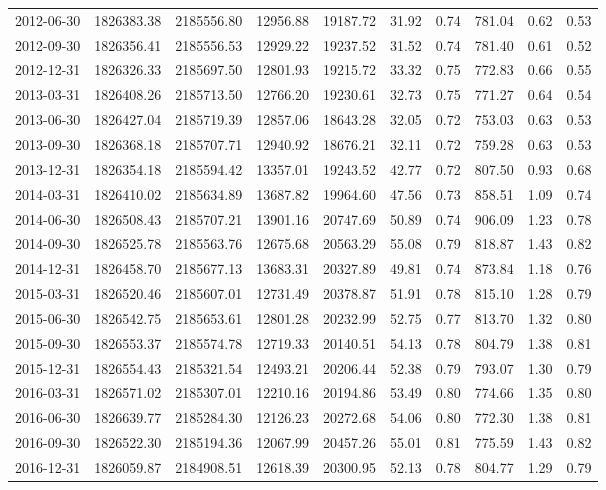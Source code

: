 \begin{landscape}
\begin{longtable}{llllllllll}
2012-06-30 & 1826383.38 & 2185556.80 & 12956.88 & 19187.72 & 31.92 & 0.74 & 781.04 & 0.62 & 0.53 \\
2012-09-30 & 1826356.41 & 2185556.53 & 12929.22 & 19237.52 & 31.52 & 0.74 & 781.40 & 0.61 & 0.52 \\
2012-12-31 & 1826326.33 & 2185697.50 & 12801.93 & 19215.72 & 33.32 & 0.75 & 772.83 & 0.66 & 0.55 \\
2013-03-31 & 1826408.26 & 2185713.50 & 12766.20 & 19230.61 & 32.73 & 0.75 & 771.27 & 0.64 & 0.54 \\
2013-06-30 & 1826427.04 & 2185719.39 & 12857.06 & 18643.28 & 32.05 & 0.72 & 753.03 & 0.63 & 0.53 \\
2013-09-30 & 1826368.18 & 2185707.71 & 12940.92 & 18676.21 & 32.11 & 0.72 & 759.28 & 0.63 & 0.53 \\
2013-12-31 & 1826354.18 & 2185594.42 & 13357.01 & 19243.52 & 42.77 & 0.72 & 807.50 & 0.93 & 0.68 \\
2014-03-31 & 1826410.02 & 2185634.89 & 13687.82 & 19964.60 & 47.56 & 0.73 & 858.51 & 1.09 & 0.74 \\
2014-06-30 & 1826508.43 & 2185707.21 & 13901.16 & 20747.69 & 50.89 & 0.74 & 906.09 & 1.23 & 0.78 \\
2014-09-30 & 1826525.78 & 2185563.76 & 12675.68 & 20563.29 & 55.08 & 0.79 & 818.87 & 1.43 & 0.82 \\
2014-12-31 & 1826458.70 & 2185677.13 & 13683.31 & 20327.89 & 49.81 & 0.74 & 873.84 & 1.18 & 0.76 \\
2015-03-31 & 1826520.46 & 2185607.01 & 12731.49 & 20378.87 & 51.91 & 0.78 & 815.10 & 1.28 & 0.79 \\
2015-06-30 & 1826542.75 & 2185653.61 & 12801.28 & 20232.99 & 52.75 & 0.77 & 813.70 & 1.32 & 0.80 \\
2015-09-30 & 1826553.37 & 2185574.78 & 12719.33 & 20140.51 & 54.13 & 0.78 & 804.79 & 1.38 & 0.81 \\
2015-12-31 & 1826554.43 & 2185321.54 & 12493.21 & 20206.44 & 52.38 & 0.79 & 793.07 & 1.30 & 0.79 \\
2016-03-31 & 1826571.02 & 2185307.01 & 12210.16 & 20194.86 & 53.49 & 0.80 & 774.66 & 1.35 & 0.80 \\
2016-06-30 & 1826639.77 & 2185284.30 & 12126.23 & 20272.68 & 54.06 & 0.80 & 772.30 & 1.38 & 0.81 \\
2016-09-30 & 1826522.30 & 2185194.36 & 12067.99 & 20457.26 & 55.01 & 0.81 & 775.59 & 1.43 & 0.82 \\
2016-12-31 & 1826059.87 & 2184908.51 & 12618.39 & 20300.95 & 52.13 & 0.78 & 804.77 & 1.29 & 0.79 \\

\end{longtable}
\end{landscape}
